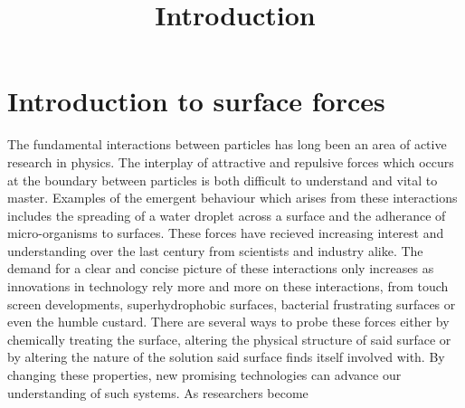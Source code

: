 \chapter{Introduction to surface forces}
 
\title{Introduction}
The fundamental interactions between particles has long been an area of active research in physics. The interplay of attractive and repulsive forces which occurs at the boundary between particles is both difficult to understand and vital to master.
Examples of the emergent behaviour which arises from these interactions includes the spreading of a water droplet across a surface and the adherance of micro-organisms to surfaces.
These forces
have
recieved increasing interest and understanding over the last century
from scientists and industry alike. The demand for a clear and concise picture of these interactions only increases as innovations in technology rely more and more on these interactions, from touch screen developments, 
superhydrophobic surfaces, bacterial frustrating surfaces or even the humble custard. 
There are several ways to 
probe these forces 
either by chemically treating the surface, altering the physical structure of said surface or by altering the
nature of the 
solution said surface finds itself involved with. By changing these properties, new promising technologies can 
advance our understanding of such 
systems.
As %
researchers become
